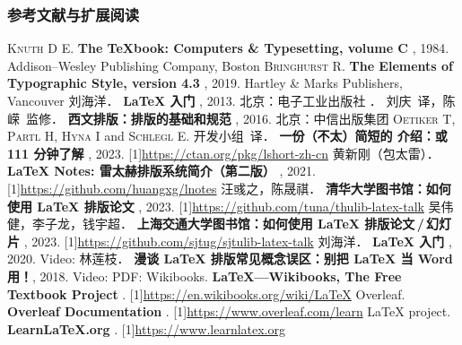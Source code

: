 \begin{frame}[fragile]
\frametitle{参考文献与扩展阅读}
\tiny
\newcommand{\BOOK}[1]{\textbf{#1}}
\newcommand{\TAG}[1]{\CASE{[#1]}}
\newcommand{\URL}[1]{\scalebox{0.92}[1]{\url{#1}}}
\begin{multicols}{2}
  \begin{thebibliography}{99}
    \bibitem{}
      \textsc{Knuth D E}.
      \BOOK{The \TeX book: Computers \& Typesetting, volume C} \TAG{M}, 1984.
      \newblock Addison--Wesley Publishing Company, Boston
    \bibitem{}
      \textsc{Bringhurst R}.
      \BOOK{The Elements of Typographic Style, version 4.3} \TAG{M}, 2019.
      \newblock Hartley \& Marks Publishers, Vancouver
    \bibitem{}
      刘海洋．
      \BOOK{\LaTeX{} 入门} \TAG{M}, 2013.
      \newblock 北京：电子工业出版社
    \bibitem{}
      ．
      刘庆~译，陈嵘~监修．
      \BOOK{西文排版：排版的基础和规范} \TAG{M}, 2016.
      \newblock 北京：中信出版集团
    \bibitem{}
      \textsc{Oetiker T}, \textsc{Partl H}, \textsc{Hyna I} and \textsc{Schlegl E}.
      \CTeX{} 开发小组~译．
      \BOOK{一份（不太）简短的 \LaTeXe{} 介绍：或 111 分钟了解 \LaTeXe{}} \TAG{EB/OL}, 2023.
      \newblock \URL{https://ctan.org/pkg/lshort-zh-cn}
    \bibitem{}
      黄新刚（包太雷）．
      \BOOK{\LaTeX{} Notes: 雷太赫排版系统简介（第二版）} \TAG{EB/OL}, 2021.
      \newblock \URL{https://github.com/huangxg/lnotes}
    \bibitem{}
      汪彧之，陈晟祺．
      \BOOK{清华大学图书馆：如何使用 \LaTeX{} 排版论文} \TAG{EB/OL}, 2023.
      \newblock \URL{https://github.com/tuna/thulib-latex-talk}
    \bibitem{}
      吴伟健，李子龙，钱宇超．
      \BOOK{上海交通大学图书馆：如何使用 \LaTeX{} 排版论文\,/\,幻灯片} \TAG{EB/OL}, 2023.
      \newblock \URL{https://github.com/sjtug/sjtulib-latex-talk}
    \bibitem{}
      刘海洋．
      \BOOK{\LaTeX{} 入门} \TAG{EB/OL}, 2020.
      \newblock Video: \href{https://www.bilibili.com/video/BV1s7411U7Pr}{\faVideo}
    \bibitem{}
      林莲枝．
      \BOOK{漫谈 \LaTeX{} 排版常见概念误区：别把 \LaTeX{} 当 Word 用！}\TAG{EB/OL}, 2018.
      \newblock Video: \href{https://www.bilibili.com/video/BV1r4411o7KJ}{\faVideo}\quad
        PDF: \href{http://static.latexstudio.net/wp-content/uploads/2018/03/LianTze-presentation-0320-forReading.pdf}{\faDownload}
    \bibitem{}
      Wikibooks.
      \BOOK{\LaTeX{}---Wikibooks, The Free Textbook Project} \TAG{EB/OL}.
      \newblock \URL{https://en.wikibooks.org/wiki/LaTeX}
    \bibitem{}
      Overleaf.
      \BOOK{Overleaf Documentation} \TAG{EB/OL}.
      \newblock \URL{https://www.overleaf.com/learn}
    \bibitem{}
      \LaTeX{} project.
      \BOOK{Learn\LaTeX.org} \TAG{EB/OL}.
      \newblock \URL{https://www.learnlatex.org}
  \end{thebibliography}
\end{multicols}
\end{frame}
